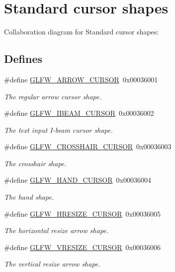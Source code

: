 \hypertarget{group__shapes}{
\section{Standard cursor shapes}
\label{group__shapes}
}


Collaboration diagram for Standard cursor shapes:\subsection*{Defines}
\begin{CompactItemize}
\item 
\#define \hyperlink{group__shapes_g8ab0e717245b85506cb0eaefdea39d0a}{GLFW\_\-ARROW\_\-CURSOR}~0x00036001
\begin{CompactList}\small\item\em The regular arrow cursor shape. \item\end{CompactList}\item 
\#define \hyperlink{group__shapes_g36185f4375eaada1b04e431244774c86}{GLFW\_\-IBEAM\_\-CURSOR}~0x00036002
\begin{CompactList}\small\item\em The text input I-beam cursor shape. \item\end{CompactList}\item 
\#define \hyperlink{group__shapes_g8af88c0ea05ab9e8f9ac1530e8873c22}{GLFW\_\-CROSSHAIR\_\-CURSOR}~0x00036003
\begin{CompactList}\small\item\em The crosshair shape. \item\end{CompactList}\item 
\#define \hyperlink{group__shapes_g1db35e20849e0837c82e3dc1fd797263}{GLFW\_\-HAND\_\-CURSOR}~0x00036004
\begin{CompactList}\small\item\em The hand shape. \item\end{CompactList}\item 
\#define \hyperlink{group__shapes_gbb3eb0109f11bb808fc34659177ca962}{GLFW\_\-HRESIZE\_\-CURSOR}~0x00036005
\begin{CompactList}\small\item\em The horizontal resize arrow shape. \item\end{CompactList}\item 
\#define \hyperlink{group__shapes_gf024f0e1ff8366fb2b5c260509a1fce5}{GLFW\_\-VRESIZE\_\-CURSOR}~0x00036006
\begin{CompactList}\small\item\em The vertical resize arrow shape. \item\end{CompactList}\end{CompactItemize}


